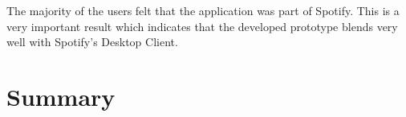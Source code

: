          The majority of the users felt that the application was part of Spotify.
         This is a very important result which indicates that the developed prototype blends very well with Spotify's Desktop Client.
  


\section{Summary} %


